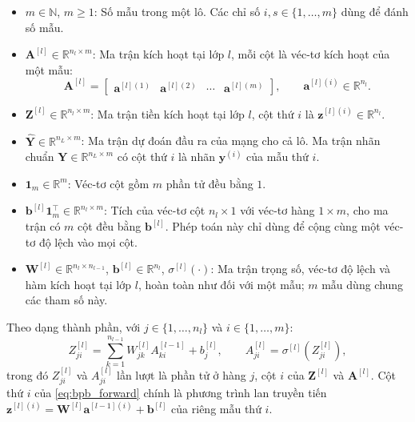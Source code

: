 \begin{itemize}
    \item $m \in \mathbb{N}$, $m \geq 1$: Số mẫu trong một lô. Các chỉ số $i, s \in \{1,\dots,m\}$ dùng để đánh số mẫu.
    \item $\mathbf{A}^{[l]} \in \mathbb{R}^{n_l \times m}$: Ma trận kích hoạt tại lớp $l$, mỗi cột là véc-tơ kích hoạt của một mẫu:
    \[
    \mathbf{A}^{[l]} = \begin{bmatrix} \mathbf{a}^{[l](1)} & \mathbf{a}^{[l](2)} & \cdots & \mathbf{a}^{[l](m)} \end{bmatrix},
    \qquad \mathbf{a}^{[l](i)} \in \mathbb{R}^{n_l}.
    \]
    \item $\mathbf{Z}^{[l]} \in \mathbb{R}^{n_l \times m}$: Ma trận tiền kích hoạt tại lớp $l$, cột thứ $i$ là $\mathbf{z}^{[l](i)} \in \mathbb{R}^{n_l}$.
    \item $\widehat{\mathbf{Y}} \in \mathbb{R}^{n_L \times m}$: Ma trận dự đoán đầu ra của mạng cho cả lô. Ma trận nhãn chuẩn $\mathbf{Y} \in \mathbb{R}^{n_L \times m}$ có cột thứ $i$ là nhãn $\mathbf{y}^{(i)}$ của mẫu thứ $i$.
    \item $\mathbf{1}_m \in \mathbb{R}^{m}$: Véc-tơ cột gồm $m$ phần tử đều bằng $1$.
    \item $\mathbf{b}^{[l]}\mathbf{1}_m^{\top} \in \mathbb{R}^{n_l \times m}$: Tích của véc-tơ cột $n_l \times 1$ với véc-tơ hàng $1 \times m$, cho ma trận có $m$ cột đều bằng $\mathbf{b}^{[l]}$. Phép toán này chỉ dùng để cộng cùng một véc-tơ độ lệch vào mọi cột.
    \item $\mathbf{W}^{[l]} \in \mathbb{R}^{n_l \times n_{l-1}}$, $\mathbf{b}^{[l]} \in \mathbb{R}^{n_l}$, $\sigma^{[l]}(\cdot)$: Ma trận trọng số, véc-tơ độ lệch và hàm kích hoạt tại lớp $l$, hoàn toàn như đối với một mẫu; $m$ mẫu dùng chung các tham số này.
\end{itemize}
Theo dạng thành phần, với $j \in \{1,\dots,n_l\}$ và $i \in \{1,\dots,m\}$:
\begin{equation}
Z_{ji}^{[l]} = \sum_{k=1}^{n_{l-1}} W_{jk}^{[l]} A_{ki}^{[l-1]} + b_j^{[l]}, \qquad A_{ji}^{[l]} = \sigma^{[l]}\!\left(Z_{ji}^{[l]}\right),
\label{eq:bpb_forward_component}
\end{equation}
trong đó $Z_{ji}^{[l]}$ và $A_{ji}^{[l]}$ lần lượt là phần tử ở hàng $j$, cột $i$ của $\mathbf{Z}^{[l]}$ và $\mathbf{A}^{[l]}$. Cột thứ $i$ của \eqref{eq:bpb_forward} chính là phương trình lan truyền tiến $\mathbf{z}^{[l](i)} = \mathbf{W}^{[l]}\mathbf{a}^{[l-1](i)} + \mathbf{b}^{[l]}$ của riêng mẫu thứ $i$.
 
